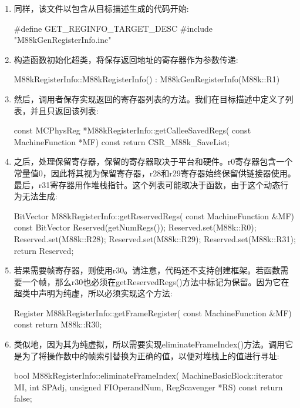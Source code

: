 \begin{enumerate}
\item
同样，该文件以包含从目标描述生成的代码开始:

\begin{cpp}
#define GET_REGINFO_TARGET_DESC
#include "M88kGenRegisterInfo.inc"
\end{cpp}

\item
构造函数初始化超类，将保存返回地址的寄存器作为参数传递:

\begin{cpp}
M88kRegisterInfo::M88kRegisterInfo()
    : M88kGenRegisterInfo(M88k::R1) {}
\end{cpp}

\item
然后，调用者保存实现返回的寄存器列表的方法。我们在目标描述中定义了列表，并且只返回该列表:

\begin{cpp}
const MCPhysReg *M88kRegisterInfo::getCalleeSavedRegs(
        const MachineFunction *MF) const {
    return CSR_M88k_SaveList;
}
\end{cpp}

\item
之后，处理保留寄存器，保留的寄存器取决于平台和硬件。r0寄存器包含一个常量值0，因此将其视为保留寄存器，r28和r29寄存器始终保留供链接器使用。最后，r31寄存器用作堆栈指针。这个列表可能取决于函数，由于这个动态行为无法生成:

\begin{cpp}
BitVector M88kRegisterInfo::getReservedRegs(
        const MachineFunction &MF) const {
    BitVector Reserved(getNumRegs());
    Reserved.set(M88k::R0);
    Reserved.set(M88k::R28);
    Reserved.set(M88k::R29);
    Reserved.set(M88k::R31);
    return Reserved;
}
\end{cpp}

\item
若果需要帧寄存器，则使用r30。请注意，代码还不支持创建框架。若函数需要一个帧，那么r30也必须在getReservedRegs()方法中标记为保留。因为它在超类中声明为纯虚，所以必须实现这个方法:

\begin{cpp}
Register M88kRegisterInfo::getFrameRegister(
        const MachineFunction &MF) const {
    return M88k::R30;
}
\end{cpp}

\item
类似地，因为其为纯虚拟，所以需要实现eliminateFrameIndex()方法。调用它是为了将操作数中的帧索引替换为正确的值，以便对堆栈上的值进行寻址:

\begin{cpp}
bool M88kRegisterInfo::eliminateFrameIndex(
        MachineBasicBlock::iterator MI, int SPAdj,
        unsigned FIOperandNum, RegScavenger *RS) const {
    return false;
}
\end{cpp}

\end{enumerate}


